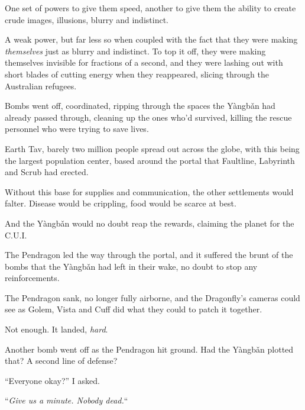 One set of powers to give them speed, another to give them the ability to create crude images, illusions, blurry and indistinct.



A weak power, but far less so when coupled with the fact that they were making \emph{themselves} just as blurry and indistinct.  To top it off, they were making themselves invisible for fractions of a second, and they were lashing out with short blades of cutting energy when they reappeared, slicing through the Australian refugees.



Bombs went off, coordinated, ripping through the spaces the Y\`{a}ngb\v{a}n had already passed through, cleaning up the ones who'd survived, killing the rescue personnel who were trying to save lives.



Earth Tav, barely two million people spread out across the globe, with this being the largest population center, based around the portal that Faultline, Labyrinth and Scrub had erected.



Without this base for supplies and communication, the other settlements would falter.  Disease would be crippling, food would be scarce at best.



And the Y\`{a}ngb\v{a}n would no doubt reap the rewards, claiming the planet for the C.U.I.



The Pendragon led the way through the portal, and it suffered the brunt of the bombs that the Y\`{a}ngb\v{a}n had left in their wake, no doubt to stop any reinforcements.



The Pendragon sank, no longer fully airborne, and the Dragonfly's cameras could see as Golem, Vista and Cuff did what they could to patch it together.



Not enough.  It landed, \emph{hard}.



Another bomb went off as the Pendragon hit ground.  Had the Y\`{a}ngb\v{a}n plotted that?  A second line of defense?



``Everyone okay?'' I asked.



``\emph{Give us a minute.  Nobody dead.}``



